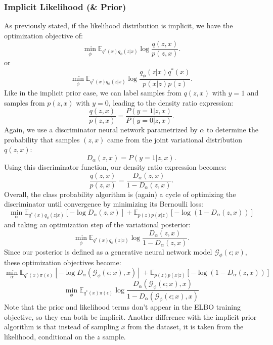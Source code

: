 \documentclass[a4paper,12pt]{article}
\numberwithin{equation}{section}
\begin{document}
\subsubsection{Implicit Likelihood (\& Prior)}
As previously stated, if the likelihood distribution is implicit, we have the optimization objective of:
\[\min_\phi \mathbb{E}_{q^*(x)q_\phi(z|x)}\log \frac{q(z,x)}{p(z,x)}.\]
or
\[\min_\phi \mathbb{E}_{q^*(x)q_\phi(z|x)}\log \frac{q_\phi(z|x)q^*(x)}{p(x|z)p(z)}.\]
Like in the implicit prior case, we can label samples from $q(z,x)$ with $y=1$ and samples from $p(z,x)$ with $y=0$, leading to the density ratio expression:
\[\frac{q(z,x)}{p(z,x)}=\frac{P(y=1|z,x)}{P(y=0|z,x)}.\]
Again, we use a discriminator neural network parametrized by $\alpha$ to determine the probability that samples $(z,x)$ came from the joint variational distribution $q(z,x)$:
\[D_\alpha(z,x)=P(y=1|z,x).\]
Using this discriminator function, our density ratio expression becomes:
\[\frac{q(z,x)}{p(z,x)}=\frac{D_\alpha(z,x)}{1-D_\alpha(z,x)}.\]
Overall, the class probability algorithm is (again) a cycle of optimizing the discriminator until convergence by minimizing its Bernoulli loss:
\[\min_\alpha \mathbb{E}_{q^*(x)q_\phi(z|x)}[-\log D_\alpha(z,x)]+\mathbb{E}_{p(z)p(x|z)}[-\log (1-D_\alpha(z,x))]\]
and taking an optimization step of the variational posterior:
\[\min_\phi \mathbb{E}_{q^*(x)q_\phi(z|x)}\log\frac{D_\alpha(z,x)}{1-D_\alpha(z,x)}.\]
Since our posterior is defined as a generative neural network model $\mathcal{G}_\phi (\epsilon;x)$, these optimization objectives become:
\[\min_\alpha \mathbb{E}_{q^*(x)\pi(\epsilon)}[-\log D_\alpha(\mathcal{G}_\phi(\epsilon;x), x)]+\mathbb{E}_{p(z)p(x|z)}[-\log (1-D_\alpha(z,x))]\]
\[\min_\phi \mathbb{E}_{q^*(x)\pi(\epsilon)}\log\frac{D_\alpha(\mathcal{G}_\phi(\epsilon;x),x)}{1-D_\alpha(\mathcal{G}_\phi(\epsilon;x),x)}\]
Note that the prior and likelihood terms don't appear in the ELBO training objective, so they can both be implicit. Another difference with the implicit prior algorithm is that instead of sampling $x$ from the dataset, it is taken from the likelihood, conditional on the $z$ sample.
\newpage
\end{document}
